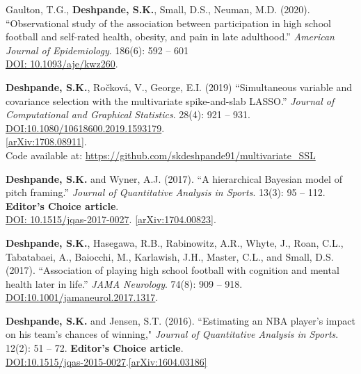 \documentclass[margin]{res}
\begin{document}
\begin{resume}
Gaulton, T.G., \textbf{Deshpande, S.K.}, Small, D.S., Neuman, M.D. (2020). ``Observational study of the association between participation in high school football and self-rated health, obesity, and pain in late adulthood.'' \textit{American Journal of Epidemiology}. 186(6): 592 -- 601 \\ \href{https://doi.org/10.1093/aje/kwz260}{DOI: 10.1093/aje/kwz260}.

\textbf{Deshpande, S.K.}, Ro\v{c}kov\'{a}, V.,  George, E.I. (2019) ``Simultaneous variable and covariance selection with the multivariate spike-and-slab LASSO.'' \textit{Journal of Computational and Graphical Statistics}. 28(4): 921 -- 931. \href{https://doi.org/10.1080/10618600.2019.1593179}{DOI:10.1080/10618600.2019.1593179}. \\ \href{https://arxiv.org/abs/1708.08911}{[arXiv:1708.08911]}. \\ Code available at: \url{https://github.com/skdeshpande91/multivariate_SSL}

\textbf{Deshpande, S.K.} and Wyner, A.J. (2017). ``A hierarchical Bayesian model of pitch framing.'' \textit{Journal of Quantitative Analysis in Sports}. 13(3): 95 -- 112. \textbf{Editor's Choice article}. \\  \href{https://doi.org/10.1515/jqas-2017-0027}{DOI: 10.1515/jqas-2017-0027}. \href{https://arxiv.org/abs/1704.00823}{[arXiv:1704.00823]}.

\textbf{Deshpande, S.K.}, Hasegawa, R.B., Rabinowitz, A.R., Whyte, J., Roan, C.L., Tabatabaei, A., Baiocchi, M., Karlawish, J.H., Master, C.L., and Small, D.S. (2017). ``Association of playing high school football with cognition and mental health later in life.'' \textit{JAMA Neurology}. 74(8): 909 -- 918. \\ \href{https://doi.org/10.1001/jamaneurol.2017.1317}{DOI:10.1001/jamaneurol.2017.1317}.

\textbf{Deshpande, S.K.} and Jensen, S.T. (2016). ``Estimating an NBA player's impact on his team's chances of winning," \textit{Journal of Quantitative Analysis in Sports}. 12(2): 51 -- 72. \textbf{Editor's Choice article}.  \\ \href{https://doi.org/10.1515/jqas-2015-0027}{DOI:10.1515/jqas-2015-0027}.\href{https://arxiv.org/abs/1604.03186}{[arXiv:1604.03186]}



\end{resume}
\end{document}

